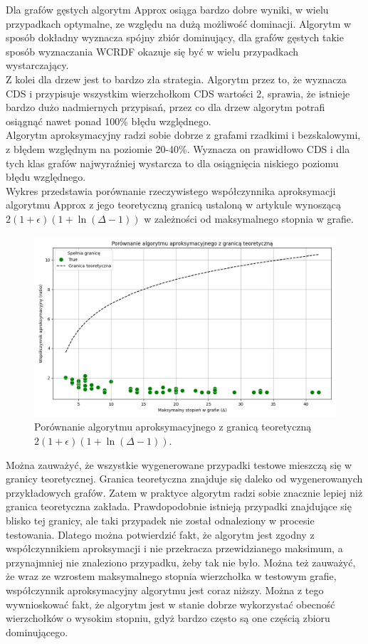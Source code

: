 Dla grafów gęstych algorytm Approx osiąga bardzo dobre wyniki, w wielu przypadkach optymalne, ze względu na dużą możliwość dominacji. Algorytm w sposób dokładny wyznacza spójny zbiór dominujący, dla grafów gęstych takie sposób wyznaczania WCRDF okazuje się być w wielu przypadkach wystarczający.\\
Z kolei dla drzew jest to bardzo zła strategia. Algorytm przez to, że wyznacza CDS i przypisuje wszystkim wierzchołkom CDS wartości 2, sprawia, że istnieje bardzo dużo nadmiernych przypisań, przez co dla drzew algorytm potrafi osiągnąć nawet ponad 100\% błędu względnego.\\
Algorytm aproksymacyjny radzi sobie dobrze z grafami rzadkimi i bezskalowymi, z błędem względnym na poziomie 20-40\%. Wyznacza on prawidłowo CDS i dla tych klas grafów najwyraźniej wystarcza to dla osiągnięcia niskiego poziomu błędu względnego.\\

Wykres przedstawia porównanie rzeczywistego współczynnika aproksymacji algorytmu Approx z jego teoretyczną granicą ustaloną w artykule \cite{ILP} wynoszącą $2(1+\epsilon)(1 + \ln(\Delta - 1))$ w zależności od maksymalnego stopnia w grafie.

\begin{figure}[H]
    \centering
    \includegraphics[width=\textwidth]{assets/plots_approx/image.png}
    \caption{Porównanie algorytmu aproksymacyjnego z granicą teoretyczną $2(1+\epsilon)(1 + \ln(\Delta - 1))$.}
    \label{fig:approxPlot}
\end{figure}

Można zauważyć, że wszystkie wygenerowane przypadki testowe mieszczą się w granicy teoretycznej. Granica teoretyczna znajduje się daleko od wygenerowanych przykładowych grafów. Zatem w praktyce algorytm radzi sobie znacznie lepiej niż granica teoretyczna zakłada. Prawdopodobnie istnieją przypadki znajdujące się blisko tej granicy, ale taki przypadek nie został odnaleziony w procesie testowania. Dlatego można potwierdzić fakt, że algorytm jest zgodny z współczynnikiem aproksymacji i nie przekracza przewidzianego maksimum, a przynajmniej nie znaleziono przypadku, żeby tak nie było. Można też zauważyć, że wraz ze wzrostem maksymalnego stopnia wierzchołka w testowym grafie, współczynnik aproksymacyjny algorytmu jest coraz niższy. Można z tego wywnioskować fakt, że algorytm jest w stanie dobrze wykorzystać obecność wierzchołków o wysokim stopniu, gdyż bardzo często są one częścią zbioru dominującego.

